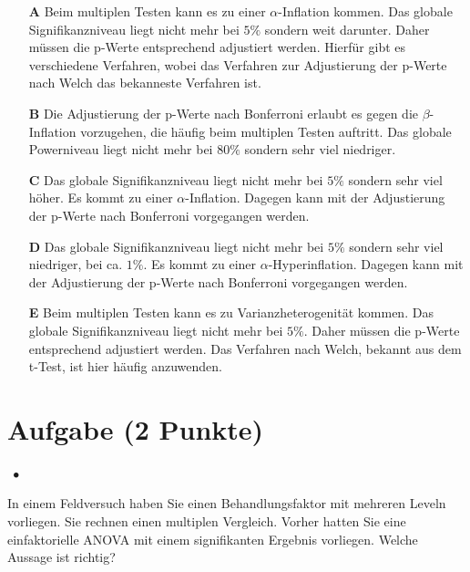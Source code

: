 \documentclass[a4paper, 9pt]{scrartcl}\usepackage[]{graphicx}\usepackage[]{xcolor}
\begin{document}
\begin{enumerate}
\item [\textbf{A} \msquare] Beim multiplen Testen kann es zu einer $\alpha$-Inflation kommen. Das globale Signifikanzniveau liegt nicht mehr bei $5\%$ sondern weit darunter. Daher müssen die p-Werte entsprechend adjustiert werden. Hierfür gibt es verschiedene Verfahren, wobei das Verfahren zur Adjustierung der p-Werte nach Welch das bekanneste Verfahren ist.
\item [\textbf{B} \msquare] Die Adjustierung der p-Werte nach Bonferroni erlaubt es gegen die $\beta$-Inflation vorzugehen, die häufig beim multiplen Testen auftritt. Das globale Powerniveau liegt nicht mehr bei $80\%$ sondern sehr viel niedriger.
\item [\textbf{C} \msquare] Das globale Signifikanzniveau liegt nicht mehr bei $5\%$ sondern sehr viel höher. Es kommt zu einer $\alpha$-Inflation. Dagegen kann mit der Adjustierung der p-Werte nach Bonferroni vorgegangen werden.
\item [\textbf{D} \msquare] Das globale Signifikanzniveau liegt nicht mehr bei $5\%$ sondern sehr viel niedriger, bei ca. $1\%$. Es kommt zu einer $\alpha$-Hyperinflation. Dagegen kann mit der Adjustierung der p-Werte nach Bonferroni vorgegangen werden.
\item [\textbf{E} \msquare] Beim multiplen Testen kann es zu Varianzheterogenität kommen. Das globale Signifikanzniveau liegt nicht mehr bei $5\%$. Daher müssen die p-Werte entsprechend adjustiert werden. Das Verfahren nach Welch, bekannt aus dem t-Test, ist hier häufig anzuwenden.
\end{enumerate}

\section{Aufgabe \hfill (2 Punkte)}

\ifcollection
\begin{flushright}
\tiny\vspace{-2Ex}
\textbf{\examinhaltstart}
\exammodulestatversuch $\;\bullet$
\exammodulebiostat
\vspace{-1Ex}
\end{flushright}
\fi




In einem Feldversuch haben Sie einen Behandlungsfaktor mit mehreren Leveln vorliegen. Sie rechnen einen multiplen Vergleich. Vorher hatten Sie eine einfaktorielle ANOVA mit einem signifikanten Ergebnis vorliegen. Welche Aussage ist richtig?
\end{document}

